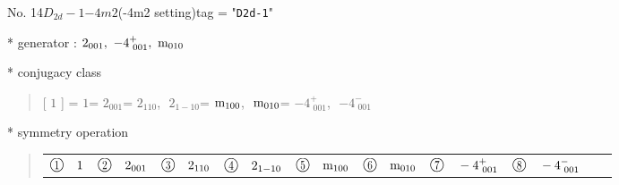 \documentclass[fleqn,10pt,landscape]{jsarticle}
\begin{document}
\newpage

No. 14\quad$D_{2d}-1$\quad$-4m2$\quad(-4m2 setting)\quad[ tetragonal ]
tag = "{\tt D2d-1}"

* generator : $2{}_{001},\,\,-4^{+}_{\,\,001},\,\,{\rm m}_{010}$

* conjugacy class
\begin{quote}
[ $1$ ] = \quad $1$\newline[ $2{}_{001}$ ] = \quad $2{}_{001}$\newline[ $2{}_{110}$ ] = \quad $2{}_{110}$,\,\, $2{}_{1-10}$\newline[ ${\rm m}_{100}$ ] = \quad ${\rm m}_{100}$,\,\, ${\rm m}_{010}$\newline[ $-4^{+}_{\,\,001}$ ] = \quad $-4^{+}_{\,\,001}$,\,\, $-4^{-}_{\,\,001}$\newline
\end{quote}

* symmetry operation
\begin{quote}
\begin{tabular}{llllllllll}
$ {\ooalign{\hfil\resizebox{.8\width}{\height}{1}\hfil\crcr\raise.1ex\hbox{\large$\bigcirc$}}}\quad 1 $ & $ {\ooalign{\hfil\resizebox{.8\width}{\height}{2}\hfil\crcr\raise.1ex\hbox{\large$\bigcirc$}}}\quad 2{}_{001} $ & $ {\ooalign{\hfil\resizebox{.8\width}{\height}{3}\hfil\crcr\raise.1ex\hbox{\large$\bigcirc$}}}\quad 2{}_{110} $ & $ {\ooalign{\hfil\resizebox{.8\width}{\height}{4}\hfil\crcr\raise.1ex\hbox{\large$\bigcirc$}}}\quad 2{}_{1-10} $ & $ {\ooalign{\hfil\resizebox{.8\width}{\height}{5}\hfil\crcr\raise.1ex\hbox{\large$\bigcirc$}}}\quad {\rm m}_{100} $ & $ {\ooalign{\hfil\resizebox{.8\width}{\height}{6}\hfil\crcr\raise.1ex\hbox{\large$\bigcirc$}}}\quad {\rm m}_{010} $ & $ {\ooalign{\hfil\resizebox{.8\width}{\height}{7}\hfil\crcr\raise.1ex\hbox{\large$\bigcirc$}}}\quad -4^{+}_{\,\,001} $ & $ {\ooalign{\hfil\resizebox{.8\width}{\height}{8}\hfil\crcr\raise.1ex\hbox{\large$\bigcirc$}}}\quad -4^{-}_{\,\,001} $
\end{tabular}
\end{quote}
\end{document}
